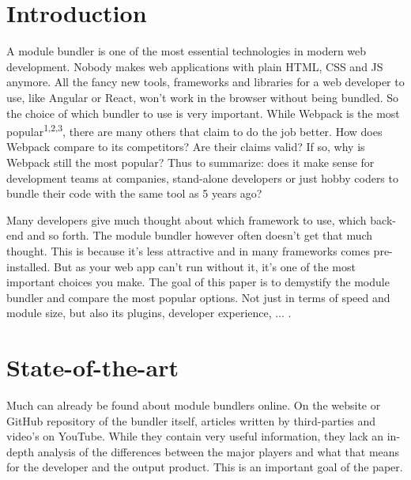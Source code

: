 
\section{Introduction} %
\label{sec:introductie}

A module bundler is one of the most essential technologies in modern web development. Nobody makes web applications with plain HTML, CSS and JS anymore. All the fancy new tools, frameworks and libraries for a web developer to use, like Angular or React, won't work in the browser without being bundled. So the choice of which bundler to use is very important.
While Webpack is the most popular\textsuperscript{1,2,3}, there are many others that claim to do the job better. How does Webpack compare to its competitors? Are their claims valid? If so, why is Webpack still the most popular? Thus to summarize: does it make sense for development teams at companies, stand-alone developers or just hobby coders to bundle their code with the same tool as 5 years ago? 

Many developers give much thought about which framework to use, which back-end and so forth. The module bundler however often doesn't get that much thought. This is because it's less attractive and in many frameworks comes pre-installed. But as your web app can't run without it, it's one of the most important choices you make. The goal of this paper is to demystify the module bundler and compare the most popular options. Not just in terms of speed and module size, but also its plugins, developer experience, ... .



\section{State-of-the-art}
\label{sec:state-of-the-art}

Much can already be found about module bundlers online. On the website or GitHub repository of the bundler itself, articles written by third-parties and video's on YouTube. While they contain very useful information, they lack an in-depth analysis of the differences between the major players and what that means for the developer and the output product. This is an important goal of the paper.


